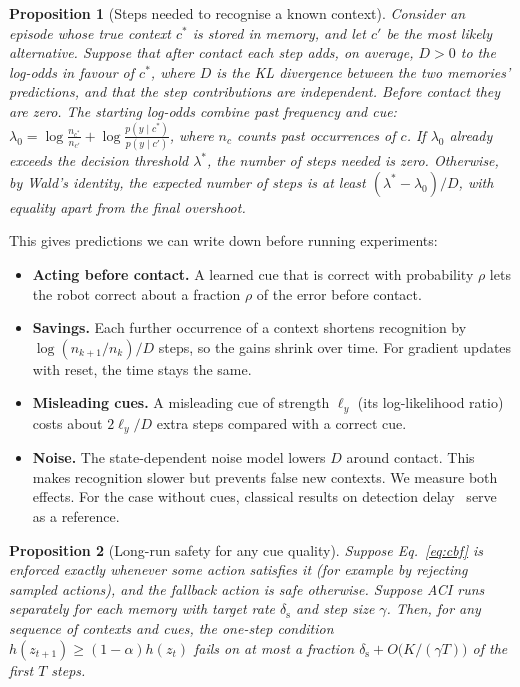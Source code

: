\documentclass[10pt]{article}
\newtheorem{proposition}{Proposition}
\begin{document}
\begin{proposition}[Steps needed to recognise a known context]\label{prop:latency}
Consider an episode whose true context $c^\ast$ is stored in memory, and let $c'$ be the most likely
alternative. Suppose that after contact each step adds, on average, $D>0$ to the log-odds in favour of
$c^\ast$, where $D$ is the KL divergence between the two memories' predictions, and that the step
contributions are independent. Before contact they are zero. The starting log-odds combine past
frequency and cue:
$\lambda_0=\log\frac{n_{c^\ast}}{n_{c'}}+\log\frac{p(y\mid c^\ast)}{p(y\mid c')}$, where $n_c$ counts
past occurrences of $c$. If $\lambda_0$ already exceeds the decision threshold $\lambda^\ast$, the
number of steps needed is zero. Otherwise, by Wald's identity, the expected number of steps is at least
$(\lambda^\ast-\lambda_0)/D$, with equality apart from the final overshoot.
\end{proposition}

This gives predictions we can write down before running experiments:
\begin{itemize}
  \item \textbf{Acting before contact.} A learned cue that is correct with probability $\rho$ lets
  the robot correct about a fraction $\rho$ of the error before contact.
  \item \textbf{Savings.} Each further occurrence of a context shortens recognition by
  $\log(n_{k+1}/n_k)/D$ steps, so the gains shrink over time. For gradient updates with reset, the time
  stays the same.
  \item \textbf{Misleading cues.} A misleading cue of strength $\ell_y$ (its log-likelihood ratio)
  costs about $2\ell_y/D$ extra steps compared with a correct cue.
  \item \textbf{Noise.} The state-dependent noise model lowers $D$ around contact. This makes
  recognition slower but prevents false new contexts. We measure both effects. For the case without
  cues, classical results on detection delay~\cite{lorden1971procedures,lai1998information} serve as
  a reference.
\end{itemize}

\begin{proposition}[Long-run safety for any cue quality]\label{prop:safety}
Suppose Eq.~\eqref{eq:cbf} is enforced exactly whenever some action satisfies it (for example by
rejecting sampled actions), and the fallback action is safe otherwise. Suppose ACI runs separately
for each memory with target rate $\delta_{\mathrm{s}}$ and step size $\gamma$. Then, for any sequence
of contexts and cues, the one-step condition $h(z_{t+1})\ge(1-\alpha)h(z_t)$ fails on at most a
fraction $\delta_{\mathrm{s}}+O\big(K/(\gamma T)\big)$ of the first $T$ steps.
\end{proposition}
\end{document}

